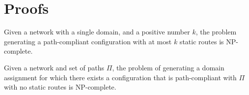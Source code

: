 \section{Proofs}
\begin{theorem}
\label{thm:ospfsynth}
Given a
network with a single domain,
and a positive number $k$,
the problem generating
a path-compliant configuration with at most $k$ static routes
is NP-complete.
\end{theorem}


\begin{theorem}
	Given a
	network and  set of paths  $\Pi$,
	the problem of generating a domain assignment for which
	there exists a 
	configuration that is path-compliant with $\Pi$ with no static routes
	is NP-complete.
\end{theorem}

